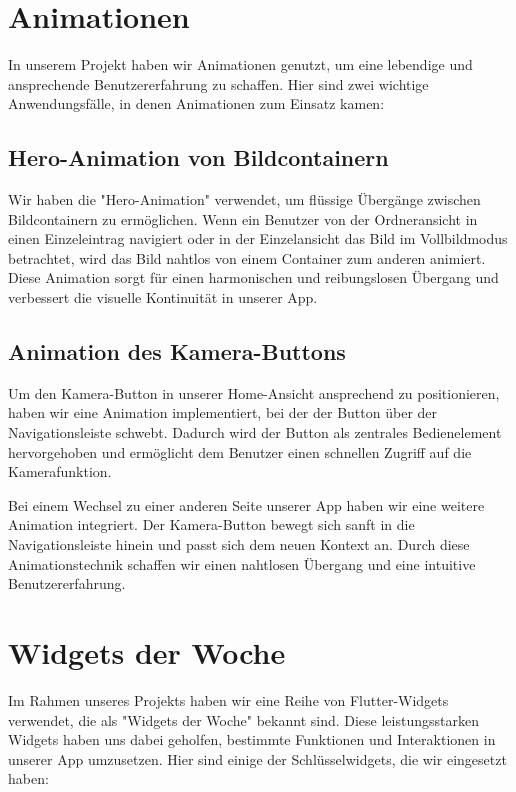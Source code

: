 \section{Animationen}

In unserem Projekt haben wir Animationen genutzt, um eine lebendige und ansprechende Benutzererfahrung zu schaffen. Hier sind zwei wichtige Anwendungsfälle, in denen Animationen zum Einsatz kamen:

\subsection{Hero-Animation von Bildcontainern}

Wir haben die "Hero-Animation" verwendet, um flüssige Übergänge zwischen Bildcontainern zu ermöglichen. Wenn ein Benutzer von der Ordneransicht in einen Einzeleintrag navigiert oder in der Einzelansicht das Bild im Vollbildmodus betrachtet, wird das Bild nahtlos von einem Container zum anderen animiert. Diese Animation sorgt für einen harmonischen und reibungslosen Übergang und verbessert die visuelle Kontinuität in unserer App.

\subsection{Animation des Kamera-Buttons}

Um den Kamera-Button in unserer Home-Ansicht ansprechend zu positionieren, haben wir eine Animation implementiert, bei der der Button über der Navigationsleiste schwebt. Dadurch wird der Button als zentrales Bedienelement hervorgehoben und ermöglicht dem Benutzer einen schnellen Zugriff auf die Kamerafunktion.

Bei einem Wechsel zu einer anderen Seite unserer App haben wir eine weitere Animation integriert. Der Kamera-Button bewegt sich sanft in die Navigationsleiste hinein und passt sich dem neuen Kontext an. Durch diese Animationstechnik schaffen wir einen nahtlosen Übergang und eine intuitive Benutzererfahrung.

\newpage

\section{Widgets der Woche}
Im Rahmen unseres Projekts haben wir eine Reihe von Flutter-Widgets verwendet, die als "Widgets der Woche" bekannt sind. Diese leistungsstarken Widgets haben uns dabei geholfen, bestimmte Funktionen und Interaktionen in unserer App umzusetzen. Hier sind einige der Schlüsselwidgets, die wir eingesetzt haben:


